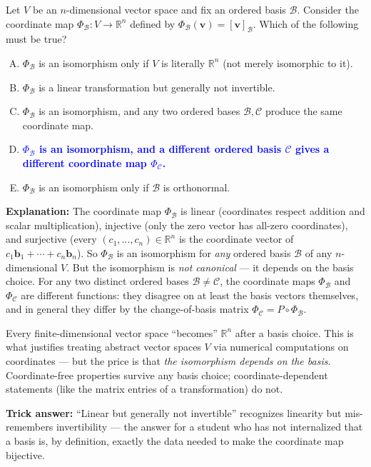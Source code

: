 \documentclass[12pt]{amsart}
\begin{document}
Let $V$ be an $n$-dimensional vector space and fix an ordered basis $\mathcal{B}$.
Consider the coordinate map
$\Phi_{\mathcal{B}} : V \to \mathbb{R}^n$ defined by
$\Phi_{\mathcal{B}}(\mathbf{v}) = [\mathbf{v}]_{\mathcal{B}}$.
Which of the following must be true?

\begin{enumerate}[(A)]
\item $\Phi_{\mathcal{B}}$ is an isomorphism only if $V$ is literally $\mathbb{R}^n$ (not merely isomorphic to it).
\item $\Phi_{\mathcal{B}}$ is a linear transformation but generally not invertible.
\item $\Phi_{\mathcal{B}}$ is an isomorphism, and any two ordered bases $\mathcal{B}, \mathcal{C}$ produce the same coordinate map.
\item \textcolor{blue}{\textbf{$\Phi_{\mathcal{B}}$ is an isomorphism, and a different ordered basis $\mathcal{C}$ gives a different coordinate map $\Phi_{\mathcal{C}}$.}}
\item $\Phi_{\mathcal{B}}$ is an isomorphism only if $\mathcal{B}$ is orthonormal.
\end{enumerate}

\textbf{Explanation:}
The coordinate map $\Phi_{\mathcal{B}}$ is linear (coordinates respect addition
and scalar multiplication), injective (only the zero vector has all-zero
coordinates), and surjective (every $(c_1, \ldots, c_n) \in \mathbb{R}^n$
is the coordinate vector of $c_1 \mathbf{b}_1 + \cdots + c_n \mathbf{b}_n$).
So $\Phi_{\mathcal{B}}$ is an isomorphism for \emph{any} ordered basis
$\mathcal{B}$ of any $n$-dimensional $V$. But the isomorphism is \emph{not
canonical} --- it depends on the basis choice. For any two distinct ordered
bases $\mathcal{B} \neq \mathcal{C}$, the coordinate maps $\Phi_{\mathcal{B}}$
and $\Phi_{\mathcal{C}}$ are different functions: they disagree on at least
the basis vectors themselves, and in general they differ by the
change-of-basis matrix $\Phi_{\mathcal{C}} = P \circ \Phi_{\mathcal{B}}$.

Every finite-dimensional vector space ``becomes'' $\mathbb{R}^n$ after a
basis choice. This is what justifies treating abstract vector spaces $V$
via numerical computations on coordinates --- but the price is that
\emph{the isomorphism depends on the basis}. Coordinate-free properties
survive any basis choice; coordinate-dependent statements (like the matrix
entries of a transformation) do not.

\textbf{Trick answer:}
``Linear but generally not invertible'' recognizes linearity but
mis-remembers invertibility --- the answer for a student who has not
internalized that a basis is, by definition, exactly the data needed to
make the coordinate map bijective.
\end{document}
